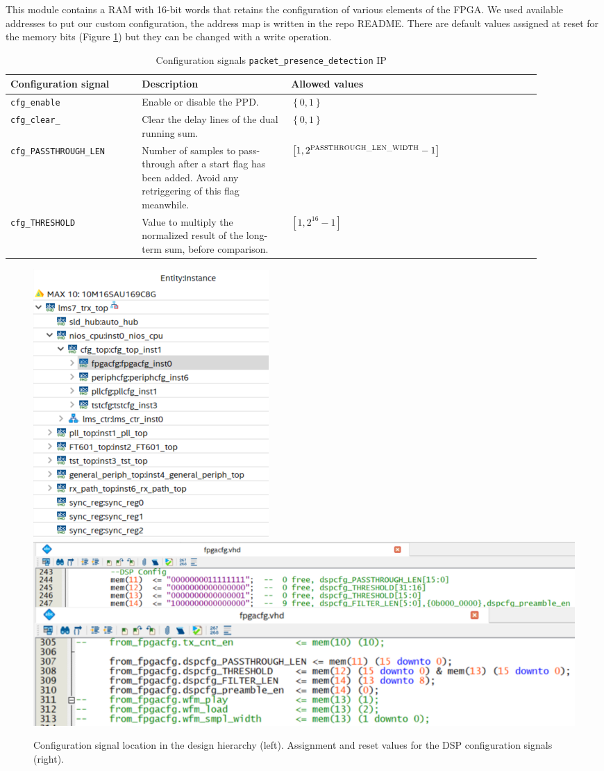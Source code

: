 This module contains a RAM with 16-bit words that retains the configuration of various elements of the FPGA. We used available addresses to put our custom configuration, the address map is written in the repo README. There are default values assigned at reset for the memory bits (Figure \ref{fig:design_hier_fpgacfg}) but they can be changed with a write operation.

\begin{table}[!h]
\centering
\begin{tabular}{|p{0.22\linewidth}|p{0.25\linewidth}|p{0.34\linewidth}|p{0.08\linewidth}|}
\hline
Configuration signal & Description & Allowed values\\
\hline
\texttt{cfg\_enable} & Enable or disable the PPD. & $\left\{0,1\right\}$ \\
\hline
\texttt{cfg\_clear\_} & Clear the delay lines of the dual running sum. & $\left\{0,1\right\}$ \\
\hline
\texttt{cfg\_PASSTHROUGH\_LEN} & Number of samples to pass-through after a start flag has been added. Avoid any retriggering of this flag meanwhile. & $\left[1,2^{\textsc{PASSTHROUGH\_LEN\_WIDTH}}-1\right]$ \\
\hline
\texttt{cfg\_THRESHOLD} & Value to multiply the normalized result of the long-term sum, before comparison. & $\left[1,2^{16}-1\right]$ \\
\hline
\end{tabular}
\caption{Configuration signals \texttt{packet\_presence\_detection} IP}
\label{table:pd_soft_param}
\end{table}

\begin{figure}[!h]
    \centering
    \includegraphics[width=0.3\linewidth]{figures/design_hierarchy_fpgacfg.PNG}
    \includegraphics[width=0.6\linewidth]{figures/design_hierarchy_fpgacfg_both.PNG}
    \caption{Configuration signal location in the design hierarchy (left). Assignment and reset values for the DSP configuration signals (right).}
    \label{fig:design_hier_fpgacfg}
\end{figure}

